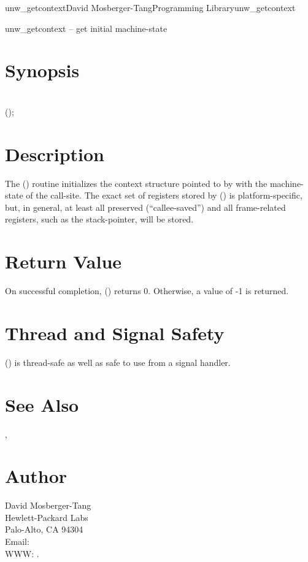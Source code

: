 \documentclass{article}
\begin{document}
\begin{Name}{3}{unw\_getcontext}{David Mosberger-Tang}{Programming Library}{unw\_getcontext}

  unw\_getcontext -- get initial machine-state
\end{Name}

\section{Synopsis}

\\

 ();\\

\section{Description}

The () routine initializes the context structure
pointed to by  with the machine-state of the call-site.  The
exact set of registers stored by () is
platform-specific, but, in general, at least all preserved
(``callee-saved'') and all frame-related registers, such as the
stack-pointer, will be stored.

\section{Return Value}

On successful completion, () returns 0.
Otherwise, a value of -1 is returned.

\section{Thread and Signal Safety}

() is thread-safe as well as safe to use
from a signal handler.

\section{See Also}

,

\section{Author}

\noindent
David Mosberger-Tang\\
Hewlett-Packard Labs\\
Palo-Alto, CA 94304\\
Email: \\
WWW: .
\LatexManEnd
\end{document}
